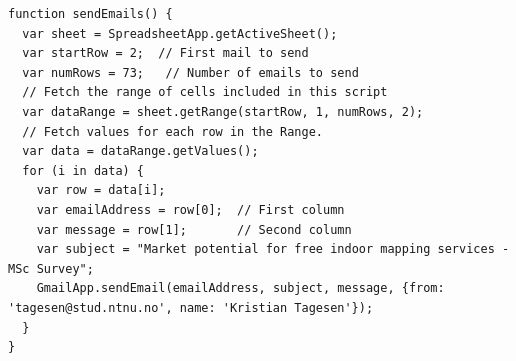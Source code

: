 
\lstset{
   language=JavaScript,
   extendedchars=true,
   basicstyle=\footnotesize\ttfamily,
   showstringspaces=false,
   showspaces=false,
   numbers=left,
   numberstyle=\footnotesize,
   numbersep=9pt,
   tabsize=2,
   breaklines=true,
   showtabs=false,
   captionpos=b
}

\medskip
\begin{lstlisting}[caption=Email Sendout Script,label={lst:email}]
function sendEmails() {
  var sheet = SpreadsheetApp.getActiveSheet();
  var startRow = 2;  // First mail to send
  var numRows = 73;   // Number of emails to send
  // Fetch the range of cells included in this script
  var dataRange = sheet.getRange(startRow, 1, numRows, 2);
  // Fetch values for each row in the Range.
  var data = dataRange.getValues();
  for (i in data) {
    var row = data[i];
    var emailAddress = row[0];  // First column
    var message = row[1];       // Second column
    var subject = "Market potential for free indoor mapping services - MSc Survey";
    GmailApp.sendEmail(emailAddress, subject, message, {from: 'tagesen@stud.ntnu.no', name: 'Kristian Tagesen'});
  }
}
\end{lstlisting}


